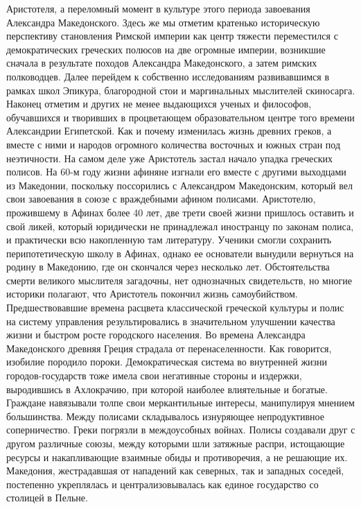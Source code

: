 Аристотеля, а переломный момент в культуре этого периода завоевания Александра
Македонского. Здесь же мы отметим кратенько историческую перспективу становления
Римской империи как центр тяжести переместился с демократических греческих
полюсов на две огромные империи, возникшие сначала в результате походов
Александра Македонского, а затем римских полководцев. Далее перейдем к
собственно исследованиям развивавшимся в рамках школ Эпикура, благородной стои и
маргинальных мыслителей скиносарга. Наконец отметим и других не менее выдающихся
ученых и философов, обучавшихся и творивших в процветающем образовательном
центре того времени Александрии Египетской. Как и почему изменилась жизнь
древних греков, а вместе с ними и народов огромного количества восточных и южных
стран под неэтичности. На самом деле уже Аристотель застал начало упадка
греческих полисов. На 60-м году жизни афиняне изгнали его вместе с другими
выходцами из Македонии, поскольку поссорились с Александром Македонским, который
вел свои завоевания в союзе с враждебными афином полисами. Аристотелю,
прожившему в Афинах более 40 лет, две трети своей жизни пришлось оставить и свой
ликей, который юридически не принадлежал иностранцу по законам полиса, и
практически всю накопленную там литературу. Ученики смогли сохранить
перипотетическую школу в Афинах, однако ее основатели вынудили вернуться на
родину в Македонию, где он скончался через несколько лет. Обстоятельства смерти
великого мыслителя загадочны, нет однозначных свидетельств, но многие историки
полагают, что Аристотель покончил жизнь самоубийством. Предшествовавшие времена
расцвета классической греческой культуры и полис на систему управления
результировались в значительном улучшении качества жизни и быстром росте
городского населения. Во времена Александра Македонского древняя Греция страдала
от перенаселенности. Как говорится, изобилие породило пороки. Демократическая
система во внутренней жизни городов-государств тоже имела свои негативные
стороны и издержки, выродившись в Ахлокрачию, при которой наиболее влиятельные и
богатые. Граждане навязывали толпе свои меркантильные интересы, манипулируя
мнением большинства. Между полисами складывалось изнуряющее непродуктивное
соперничество. Греки погрязли в междоусобных войнах. Полисы создавали друг с
другом различные союзы, между которыми шли затяжные распри, истощающие ресурсы и
накапливающие взаимные обиды и противоречия, а не решающие их. Македония,
жестрадавшая от нападений как северных, так и западных соседей, постепенно
укреплялась и централизовывалась как единое государство со столицей в Пельне.
